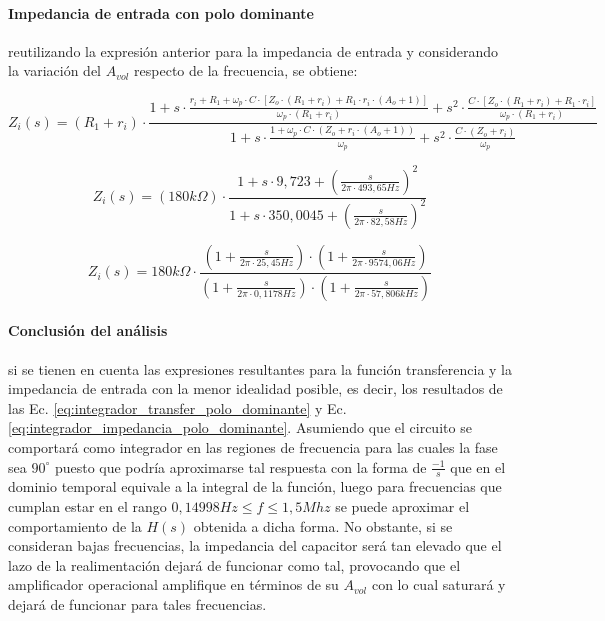 \paragraph*{Impedancia de entrada con polo dominante} reutilizando la expresi\'on anterior para la impedancia de entrada y considerando la variaci\'on del $A_{vol}$ respecto de la frecuencia, se obtiene:

\begin{equation*}
	Z_i(s) = (R_1 + r_i) \cdot \frac{1 + s \cdot \frac{r_i + R_1 + \omega_p \cdot C \cdot \left[ Z_o \cdot ( R_1 + r_i ) + R_1 \cdot r_i \cdot (A_o + 1) \right]}{\omega_p \cdot (R_1 +r_i)} + s^{2} \cdot \frac{C \cdot \left[ Z_o \cdot (R_1 + r_i) + R_1 \cdot r_i \right]}{\omega_p \cdot (R_1 + r_i)}}{1 + s \cdot \frac{1 + \omega_p \cdot C \cdot (Z_o + r_i \cdot ( A_o + 1 ) )}{\omega_p} + s^{2} \cdot \frac{C \cdot(Z_o + r_i)}{\omega_p}}
\end{equation*}

\begin{equation*}
	Z_i(s) = (180k \Omega) \cdot \frac{1 + s \cdot 9,723 + \left( \frac{s}{2 \pi \cdot 493,65Hz} \right)^{2}	}{1 + s \cdot 350,0045 + \left(\frac{s}{2 \pi \cdot 82,58Hz} \right)^{2}}
\end{equation*}

\begin{equation}
	Z_i(s) = 180k \Omega \cdot \frac{(1 + \frac{s}{2 \pi \cdot 25,45Hz}) \cdot (1 + \frac{s}{2 \pi \cdot 9574,06Hz})}{(1 + \frac{s}{2 \pi \cdot 0,1178Hz}) \cdot (1 + \frac{s}{2 \pi \cdot 57,806kHz})}
	\label{eq:integrador_impedancia_polo_dominante}
\end{equation}

\paragraph*{Conclusi\'on del an\'alisis} si se tienen en cuenta las expresiones resultantes para la funci\'on transferencia y la impedancia de entrada con la menor idealidad posible, es decir, los resultados de las Ec. \ref{eq:integrador_transfer_polo_dominante} y Ec. \ref{eq:integrador_impedancia_polo_dominante}. Asumiendo que el circuito se comportar\'a como integrador en las regiones de frecuencia para las cuales la fase sea $90^{\circ}$ puesto que podría aproximarse tal respuesta con la forma de $\frac{-1}{s}$ que en el dominio temporal equivale a la integral de la funci\'on, luego para frecuencias que cumplan estar en el rango $0,14998Hz \leq f \leq 1,5Mhz$ se puede aproximar el comportamiento de la $H(s)$ obtenida a dicha forma. No obstante, si se consideran bajas frecuencias, la impedancia del capacitor ser\'a tan elevado que el lazo de la realimentaci\'on dejar\'a de funcionar como tal, provocando que el amplificador operacional amplifique en t\'erminos de su $A_{vol}$ con lo cual saturar\'a y dejar\'a de funcionar para tales frecuencias.

